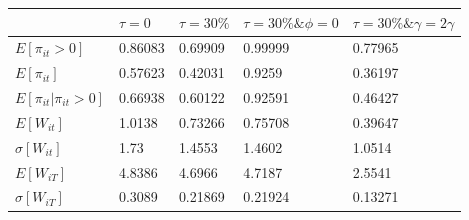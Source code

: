 \begin{tabular}{lllll}
& $\tau =0$ & $\tau =30\%$ & $\tau =30\% \& \phi = 0$ & $\tau =30\% \& \gamma = 2\gamma$ \\ 
\hline 
$E[\pi_{it}>0]$ & 0.86083 & 0.69909 & 0.99999 & 0.77965 \\ 
$E[\pi_{it}]$ & 0.57623 & 0.42031 & 0.9259 & 0.36197 \\ 
$E[\pi_{it}|\pi_{it}>0]$ & 0.66938 & 0.60122 & 0.92591 & 0.46427 \\ 
$E[W_{it}]$ & 1.0138 & 0.73266 & 0.75708 & 0.39647 \\ 
$\sigma[W_{it}]$ & 1.73 & 1.4553 & 1.4602 & 1.0514 \\ 
$E[W_{iT}]$ & 4.8386 & 4.6966 & 4.7187 & 2.5541 \\ 
$\sigma[W_{iT}]$ & 0.3089 & 0.21869 & 0.21924 & 0.13271 \\ 
\hline 
\end{tabular}